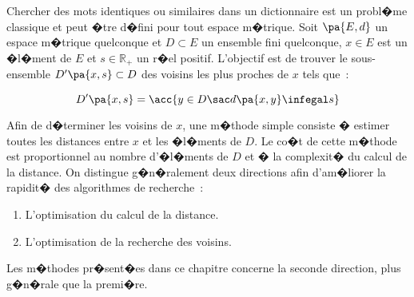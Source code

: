 %
\firstpassagedo{}
%
\firstpassagedo{}



\newcommand{\initialisation}[0]{initialisation : \\}
\newcommand{\step}[0]{body : \newline}
\newcommand{\terminaison}[0]{termination : \\}
\newcommand{\for}[2]{for $#1$ to $#2$ do}
\newcommand{\forend}[0]{end for \\}
\newcommand{\while}[1]{while $\pa { #1 }$ do\\}
\newcommand{\whilenotl}[1]{while $\pa { #1 }$ do}
\newcommand{\whileend}[0]{end while}

\newenvironment{algopar}{}{}
\newcommand{\ind}[0]{\null \quad}

\label{space_metric_introduction}


\sloppy


Chercher des mots identiques ou similaires dans un dictionnaire est un probl�me classique et peut �tre d�fini pour tout espace m�trique.  Soit $\pa{E,d}$ un espace m�trique quelconque et $D \subset E$ un ensemble fini quelconque, $x \in E$ est un �l�ment de $E$ et $s \in \mathbb{R}_+$ un r�el positif. L'objectif est de trouver le sous-ensemble $D'\pa{x,s} \subset D$ des voisins les plus proches de $x$ tels que~:

    $$
    D'\pa{x,s} = \acc{  y \in D \sac d\pa{x,y} \infegal s}
    $$

Afin de d�terminer les voisins de $x$, une m�thode simple consiste � estimer toutes les distances entre $x$ et les �l�ments de $D$. Le co�t de cette m�thode est proportionnel au nombre d'�l�ments de $D$ et � la complexit� du calcul de la distance. On distingue g�n�ralement deux directions afin d'am�liorer la rapidit� des algorithmes de recherche~:

    \begin{enumerate}
    \item L'optimisation du calcul de la distance.
    \item L'optimisation de la recherche des voisins.
    \end{enumerate}


Les m�thodes pr�sent�es dans ce chapitre concerne la seconde direction, plus g�n�rale que la premi�re.








